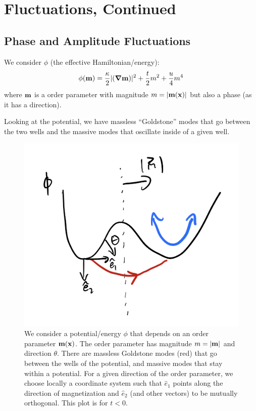 \section{Fluctuations, Continued}

\subsection{Phase and Amplitude Fluctuations}
We consider $\phi$ (the effective Hamiltonian/energy):
\begin{equation}
    \phi(\v{m}) = \frac{\kappa}{2}\abs{(\nabla \v{m})}^2 + \frac{t}{2}m^2 + \frac{u}{4}m^4
\end{equation}
where $\mathbf{m}$ is a order parameter with magnitude $m = \lvert \mathbf{m}(\mathbf{x}) \rvert$ but also a phase (as it has a direction).

Looking at the potential, we have massless ``Goldstone'' modes that go between the two wells and the massive modes that oscillate inside of a given well.

\begin{figure}[htbp]
    \centering
    \includegraphics[scale=0.3]{Lectures/Figures/mexican_hat_fluctuations.png}
    \caption{We consider a potential/energy $\phi$ that depends on an order parameter $\mathbf{m}(\mathbf{x})$. The order parameter has magnitude $m = \lvert \mathbf{m} \rvert$ and direction $\theta$. There are massless Goldstone modes (red) that go between the wells of the potential, and massive modes that stay within a potential. For a given direction of the order parameter, we choose locally a coordinate system such that $\hat{e}_1$ points along the direction of magnetization and $\hat{e}_2$ (and other vectors) to be mutually orthogonal. This plot is for $t < 0$.}
    \label{fig:mexican_hat_fluctuations}
\end{figure}

